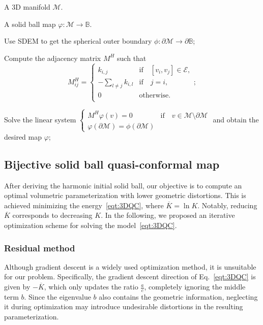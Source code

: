 \documentclass{article}
\begin{document}
\begin{algorithm}[h]
\caption{Initial ball}
\label{alg:Initial_ball}
  \begin{algorithmic}[1]
    \Require A 3D manifold $\mathcal{M}$.

    \Ensure A solid ball map $\varphi:\mathcal{M}\to \mathbb{B}$.

\State Use SDEM to get the spherical outer boundary $\phi: \partial \mathcal{M} \rightarrow \partial \mathbb B$;

\State Compute the adjacency matrix $M^H$ such that 
$$   M^{H}_{ij} = \left \{
    \begin{array}{ll}
     k_{i,j}    & \text{if} \quad \left[v_i,v_j \right] \in \mathcal{E}, \\
     -\sum_{l\neq j} k_{i,l}    & \text{if} \quad j = i, \\
     0      & \text{otherwise}. \\
    \end{array}
    \right.;$$

\State Solve the linear system $    \left \{
    \begin{array}{ll}
    M^{H} \varphi(v) = 0     & \text{if}\quad v\in \mathcal{M} \setminus \partial \mathcal{M} \\
    \varphi\left(\partial \mathcal{M} \right) = \phi \left( \partial \mathcal{M} \right)   & 
    \end{array}    
    \right.$ and obtain the desired map $\varphi$;

  \end{algorithmic}
\end{algorithm}


\subsection{Bijective solid ball quasi-conformal map}\label{sec:3dqc}
After deriving the harmonic initial solid ball, our objective is to compute an optimal volumetric parameterization with lower geometric distortions. This is achieved minimizing the energy~\eqref{eqt:3DQC}, where $\overline{K} = \ln{K}$. Notably, reducing $\overline{K}$ corresponds to decreasing $K$. In the following, we proposed an iterative optimization scheme for solving the model~\eqref{eqt:3DQC}.


\subsubsection{Residual method}
Although gradient descent is a widely used optimization method, it is unsuitable for our problem. Specifically, the gradient descent direction of Eq.~\eqref{eqt:3DQC} is given by $-\overline{K}$, which only updates the ratio $\frac{a}{c}$, completely ignoring the middle term $b$. Since the eigenvalue $b$ also contains the geometric information, neglecting it during optimization may introduce undesirable distortions in the resulting parameterization.
\end{document}

